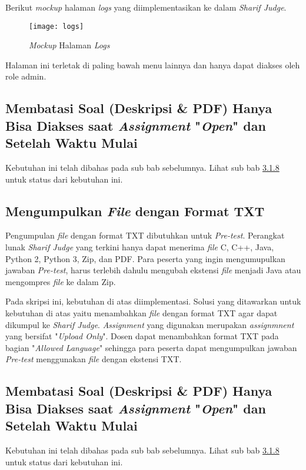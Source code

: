 Berikut \textit{mockup} halaman \textit{logs} yang diimplementasikan ke dalam \textit{Sharif Judge}.
\begin{figure}[H]
	\centering  
	\texttt{[image: logs]}  
	\caption[\textit{Mockup} Halaman \textit{Logs}]{\textit{Mockup} Halaman \textit{Logs}} 
	\label{fig:logs} 
\end{figure}
Halaman ini terletak di paling bawah menu lainnya dan hanya dapat diakses oleh role admin.

\subsection{Membatasi Soal (Deskripsi \& PDF) Hanya Bisa Diakses saat \textit{Assignment} "\textit{Open}" dan Setelah Waktu Mulai}
Kebutuhan ini telah dibahas pada sub bab sebelumnya. Lihat sub bab \hyperref[subsec:membatasisoal]{3.1.8} untuk status dari kebutuhan ini.

\subsection{Mengumpulkan \textit{File} dengan Format TXT}
\label{subsec:filetxt}
Pengumpulan \textit{file} dengan format TXT dibutuhkan untuk \textit{Pre-test}. Perangkat lunak \textit{Sharif Judge} yang terkini hanya dapat menerima \textit{file} C, C++, Java, Python 2, Python 3, Zip, dan PDF. Para peserta yang ingin mengumupulkan jawaban \textit{Pre-test}, harus terlebih dahulu mengubah ekstensi \textit{file} menjadi Java atau mengompres \textit{file} ke dalam Zip. 

Pada skripsi ini, kebutuhan di atas diimplementasi. Solusi yang ditawarkan untuk kebutuhan di atas yaitu menambahkan \textit{file} dengan format TXT agar dapat dikumpul ke \textit{Sharif Judge}. \textit{Assignment} yang digunakan merupakan \textit{assignmnent} yang bersifat "\textit{Upload Only}". Dosen dapat menambahkan format TXT pada bagian "\textit{Allowed Language}" sehingga para peserta dapat mengumpulkan jawaban \textit{Pre-test} menggunakan \textit{file} dengan ekstensi TXT.

\subsection{Membatasi Soal (Deskripsi \& PDF) Hanya Bisa Diakses saat \textit{Assignment} "\textit{Open}" dan Setelah Waktu Mulai}
Kebutuhan ini telah dibahas pada sub bab sebelumnya. Lihat sub bab \hyperref[subsec:membatasisoal]{3.1.8} untuk status dari kebutuhan ini.

